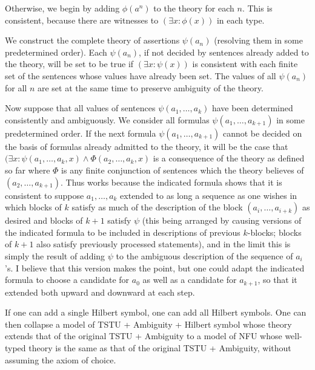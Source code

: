 \documentclass[12pt]{article}
\begin{document}
Otherwise, we begin by adding $\phi(a^n)$ to the theory for each $n$.  This is consistent, because there are witnesses to $(\exists x:\phi(x))$ in each type.

We construct the complete theory of assertions $\psi(a_n)$ (resolving them in some predetermined order).  Each $\psi(a_n)$, if not decided by sentences already added to the theory, will be set to be true if
$(\exists x:\psi(x))$ is consistent with each finite set of the sentences whose values have already been set.  The values of all $\psi(a_n)$ for all $n$ are set at the same time to preserve ambiguity of the theory.

Now suppose that all values of sentences $\psi(a_1,\ldots,a_k)$ have been determined consistently and ambiguously.  We consider all formulas $\psi(a_1,\ldots,a_{k+1})$ in some predetermined order.  If the next formula
$\psi(a_1,\ldots,a_{k+1})$ cannot be decided on the basis of formulas already admitted to the theory, it will be the case that $(\exists x:\psi(a_1,\ldots,a_k,x) \wedge \Phi(a_2,\ldots,a_k,x)$ is a consequence of the theory as
defined so far where $\Phi$ is any finite conjunction of sentences which the theory believes of $(a_2,\ldots,a_{k+1})$.  Thus works because the indicated formula shows that it is consistent to suppose $a_1,\dots,a_k$ extended
to as long a sequence as one wishes in which blocks of $k$ satisfy as much of the description of the block $(a_i,\ldots,a_{i+k})$ as desired and blocks of $k+1$ satisfy $\psi$ (this being arranged by causing versions of the indicated formula to be included in descriptions of previous $k$-blocks; blocks of $k+1$ also satisfy previously processed statements), and in the limit this is simply the result of adding $\psi$ to the ambiguous description of the sequence of $a_i$'s.  I believe that this version makes the point, but one could adapt the indicated formula to choose a candidate for $a_0$ as well as a candidate for $a_{k+1}$, so that it extended both upward and downward at each step.

If one can add a single Hilbert symbol, one can add all Hilbert symbols.  One can then collapse a model of TSTU + Ambiguity + Hilbert symbol whose theory extends that of  the original TSTU + Ambiguity to a model of
NFU whose well-typed theory is the same as that of the original TSTU + Ambiguity, without assuming the axiom of choice.
\end{document}
